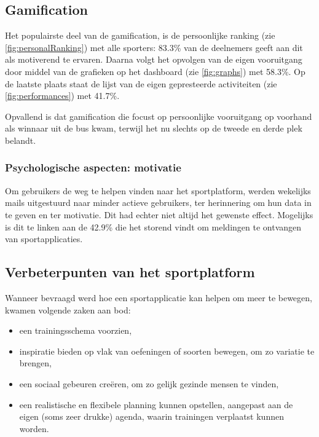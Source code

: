 \subsection{Gamification}

Het populairste deel van de gamification, is de persoonlijke ranking (zie \ref{fig:personalRanking}) met alle sporters: 83.3\% van de deelnemers geeft aan dit als motiverend te ervaren.
Daarna volgt het opvolgen van de eigen vooruitgang door middel van de grafieken op het dashboard (zie \ref{fig:graphs}) met 58.3\%.
Op de laatste plaats staat de lijst van de eigen gepresteerde activiteiten (zie \ref{fig:performances}) met 41.7\%.

Opvallend is dat gamification die focust op persoonlijke vooruitgang op voorhand als winnaar uit de bus kwam, terwijl het nu slechts op de tweede en derde plek belandt.

\subsubsection{Psychologische aspecten: motivatie}

Om gebruikers de weg te helpen vinden naar het sportplatform, werden wekelijks mails uitgestuurd naar minder actieve gebruikers, ter herinnering om hun data in te geven en ter motivatie. Dit had echter niet altijd het gewenste effect.
Mogelijks is dit te linken aan de 42.9\% die het storend vindt om meldingen te ontvangen van sportapplicaties.

\subsection{Verbeterpunten van het sportplatform}
\label{ssec:verbeterpunten}

Wanneer bevraagd werd hoe een sportapplicatie kan helpen om meer te bewegen, kwamen volgende zaken aan bod:

\begin{itemize}
    \item een trainingsschema voorzien,
    \item inspiratie bieden op vlak van oefeningen of soorten bewegen, om zo variatie te brengen,
    \item een sociaal gebeuren creëren, om zo gelijk gezinde mensen te vinden,
    \item een realistische en flexibele planning kunnen opstellen, aangepast aan de eigen (soms zeer drukke) agenda, waarin trainingen verplaatst kunnen worden.
\end{itemize}

